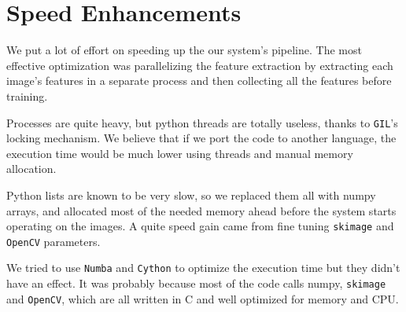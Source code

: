\section{Speed Enhancements}
We put a lot of effort on speeding up the our system's pipeline.
The most effective optimization was parallelizing the feature extraction by extracting each image's features in a separate process and then collecting all the features before training.

Processes are quite heavy, but python threads are totally useless, thanks to \texttt{GIL}'s locking mechanism.
We believe that if we port the code to another language, the execution time would be much lower using threads and manual memory allocation.

Python lists are known to be very slow, so we replaced them all with numpy arrays, and allocated most of the needed memory ahead before the system starts operating on the images.
A quite speed gain came from fine tuning \texttt{skimage} and \texttt{OpenCV} parameters.

We tried to use \texttt{Numba} and \texttt{Cython} to optimize the execution time but they didn't have an effect.
It was probably because most of the code calls numpy, \texttt{skimage} and \texttt{OpenCV}, which are all written in C and well optimized for memory and CPU.